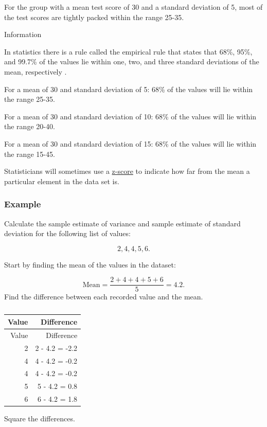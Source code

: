 \documentclass[
]{book}
\begin{document}
For the group with a mean test score of 30 and a standard deviation of 5, most of the test scores are tightly packed within the range 25-35.

Information

In statistics there is a rule called the empirical rule that states that 68\%, 95\%, and 99.7\% of the values lie within one, two, and three standard deviations of the mean, respectively \citep{lee}.

For a mean of 30 and standard deviation of 5: 68\% of the values will lie within the range 25-35.

For a mean of 30 and standard deviation of 10: 68\% of the values will lie within the range 20-40.

For a mean of 30 and standard deviation of 15: 68\% of the values will lie within the range 15-45.

Statisticians will sometimes use a \protect\hyperlink{example2}{z-score} to indicate how far from the mean a particular element in the data set is.

\hypertarget{example-10}{%
\subsubsection{Example}\label{example-10}}

Calculate the sample estimate of variance and sample estimate of standard deviation for the following list of values:

\[ 2, 4, 4, 5, 6.\]

Start by finding the mean of the values in the dataset:

\[ \textrm{Mean}= \frac{2 + 4 + 4 + 5 + 6}{5}=4.2.\]
Find the difference between each recorded value and the mean.

\begin{longtable}[]{@{}rr@{}}
\caption{\label{tab:table8}}\tabularnewline
\toprule
Value & Difference \\
\midrule
\endfirsthead
\toprule
Value & Difference \\
\midrule
\endhead
2 & 2 - 4.2 = -2.2 \\
4 & 4 - 4.2 = -0.2 \\
4 & 4 - 4.2 = -0.2 \\
5 & 5 - 4.2 = 0.8 \\
6 & 6 - 4.2 = 1.8 \\
\bottomrule
\end{longtable}

Square the differences.
\end{document}
